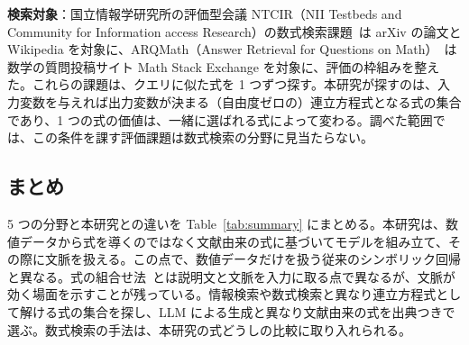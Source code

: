 \documentclass[a4j,dvipdfmx,10pt]{jresume}
\begin{document}
\textbf{検索対象}：国立情報学研究所の評価型会議 NTCIR（NII Testbeds and Community for Information access Research）の数式検索課題~\citep{NTCIR12}は arXiv の論文と Wikipedia を対象に、ARQMath（Answer Retrieval for Questions on Math）~\citep{ARQMath}は数学の質問投稿サイト Math Stack Exchange を対象に、評価の枠組みを整えた。これらの課題は、クエリに似た式を 1 つずつ探す。本研究が探すのは、入力変数を与えれば出力変数が決まる（自由度ゼロの）連立方程式となる式の集合であり、1 つの式の価値は、一緒に選ばれる式によって変わる。調べた範囲では、この条件を課す評価課題は数式検索の分野に見当たらない。

\subsection{まとめ}
5 つの分野と本研究との違いを Table~\ref{tab:summary} にまとめる。本研究は、数値データから式を導くのではなく文献由来の式に基づいてモデルを組み立て、その際に文脈を扱える。この点で、数値データだけを扱う従来のシンボリック回帰と異なる。式の組合せ法~\citep{CombineEq}とは説明文と文脈を入力に取る点で異なるが、文脈が効く場面を示すことが残っている。情報検索や数式検索と異なり連立方程式として解ける式の集合を探し、LLM による生成と異なり文献由来の式を出典つきで選ぶ。数式検索の手法は、本研究の式どうしの比較に取り入れられる。
\end{document}

